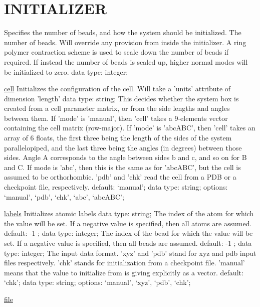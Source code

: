 \section{INITIALIZER}
\label{INITIALIZER}
\begin{ipifield}{}%
{Specifies the number of beads, and how the system should be initialized.}%
{}%
{%
{The number of beads. Will override any provision from inside the initializer. A ring polymer contraction scheme is used to scale down the number of beads if required. If instead the number of beads is scaled up, higher normal modes will be initialized to zero.}%
{data type: integer; }%
}
\begin{ipifield}{\hyperref[INITCELL]{cell}}%
{Initializes the configuration of the cell. Will take a 'units' attribute of dimension 'length'}%
{data type: string; }%
{%
{This decides whether the system box is created from a cell parameter matrix, or from the side lengths and angles between them. If 'mode' is 'manual', then 'cell' takes a 9-elements vector containing the cell matrix (row-major). If 'mode' is 'abcABC', then 'cell' takes an array of 6 floats, the first three being the length of the sides of the system parallelopiped, and the last three being the angles (in degrees) between those sides. Angle A corresponds to the angle between sides b and c, and so on for B and C. If mode is 'abc', then this is the same as for 'abcABC', but the cell is assumed to be orthorhombic. 'pdb' and 'chk' read the cell from a PDB or a checkpoint file, respectively.}%
{default: `manual'; data type: string; options: `manual', `pdb', `chk', `abc', `abcABC'; }%
}
\end{ipifield}
\begin{ipifield}{\hyperref[INITLABELS]{labels}}%
{Initializes atomic labels}%
{data type: string; }%
{%
{The index of the atom for which the value will be set. If a negative value is specified, then all atoms are assumed.}%
{default:  -1 ; data type: integer; }%
%
{The index of the bead for which the value will be set. If a negative value is specified, then all beads are assumed.}%
{default:  -1 ; data type: integer; }%
%
{The input data format. 'xyz' and 'pdb' stand for xyz and pdb input files respectively. 'chk' stands for initialization from a checkpoint file. 'manual' means that the value to initialize from is giving explicitly as a vector.}%
{default: `chk'; data type: string; options: `manual', `xyz', `pdb', `chk'; }%
}
\end{ipifield}
\begin{ipifield}{\hyperref[INITFILE]{file}}%

\end{ipifield}
\end{ipifield}
